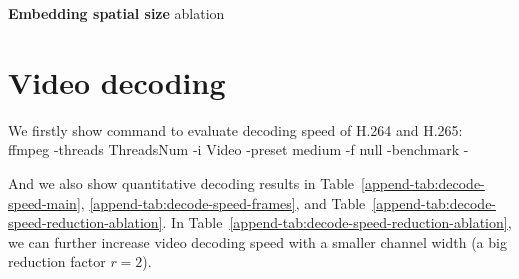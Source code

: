 \documentclass[10pt,twocolumn,letterpaper]{article}
\begin{document}
\begin{table}[h!]
    \centering
\begin{minipage}{0.24\textwidth}
\caption{\textbf{Embedding spatial size} ablation}
\label{tab:spatial-size-ablation}
\vspace{-0.5em}
\end{minipage} 
\hfill
\begin{minipage}{0.23\textwidth}
\caption{\textbf{Embedding dimension} ablation}
\label{tab:embed-dim-ablation}
\vspace{-0.5em}
\end{minipage} 
\end{table}


\section{Video decoding}
We firstly show command to evaluate decoding speed of H.264 and H.265: \\
\quad \quad ffmpeg -threads ThreadsNum  -i Video -preset medium -f null -benchmark -

And we also show quantitative decoding results in Table~\ref{append-tab:decode-speed-main}, \ref{append-tab:decode-speed-frames}, and Table~\ref{append-tab:decode-speed-reduction-ablation}.
In Table~\ref{append-tab:decode-speed-reduction-ablation}, we can further increase video decoding speed with a smaller channel width (\ie a big reduction factor $r=2$).
\end{document}
